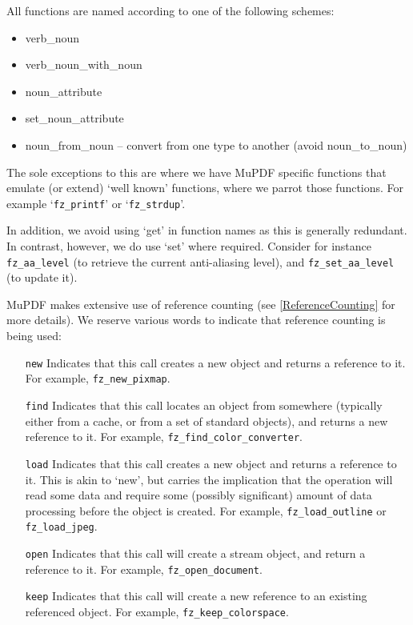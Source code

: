 \documentclass[oneside]{book}
\newcommand{\rjwref}[1] {\autoref{#1} \nameref{#1}}
\begin{document}
All functions are named according to one of the following schemes:

\begin{itemize}
\item verb\_noun
\item verb\_noun\_with\_noun
\item noun\_attribute
\item set\_noun\_attribute
\item noun\_from\_noun -- convert from one type to another (avoid noun\_to\_noun)
\end{itemize}

The sole exceptions to this are where we have MuPDF specific functions that emulate (or extend) `well known' functions, where we parrot those functions. For example `\texttt{fz\_printf}' or `\texttt{fz\_strdup}'.

In addition, we avoid using `get' in function names as this is generally redundant. In contrast, however, we do use `set' where required. Consider for instance \texttt{fz\_aa\_level} (to retrieve the current anti-aliasing level), and \texttt{fz\_set\_aa\_level} (to update it).

MuPDF makes extensive use of reference counting (see \rjwref{ReferenceCounting} for more details). We reserve various words to indicate that reference counting is being used:

\begin{itemize}
\item[\texttt{new}] Indicates that this call creates a new object and returns a reference to it. For example, \texttt{fz\_new\_pixmap}.
\item[\texttt{find}] Indicates that this call locates an object from somewhere (typically either from a cache, or from a set of standard objects), and returns a new reference to it. For example, \texttt{fz\_find\_color\_converter}.
\item[\texttt{load}] Indicates that this call creates a new object and returns a reference to it. This is akin to `new', but carries the implication that the operation will read some data and require some (possibly significant) amount of data processing before the object is created. For example, \texttt{fz\_load\_outline} or \texttt{fz\_load\_jpeg}.
\item[\texttt{open}] Indicates that this call will create a stream object, and return a reference to it. For example, \texttt{fz\_open\_document}.
\item[\texttt{keep}] Indicates that this call will create a new reference to an existing referenced object. For example, \texttt{fz\_keep\_colorspace}.
\end{itemize}
\end{document}

